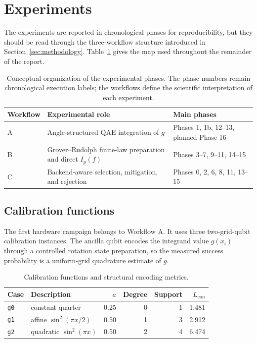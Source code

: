 \section{Experiments}
\label{sec:experiments}

The experiments are reported in chronological phases for reproducibility, but
they should be read through the three-workflow structure introduced in
Section~\ref{sec:methodology}. Table~\ref{tab:workflow-phase-map} gives the
map used throughout the remainder of the report.

\begin{table}[h]
\centering
\begin{tabular}{p{}p{}p{}}
\toprule
Workflow & Experimental role & Main phases \\
\midrule
A & Angle-structured QAE integration of \(g\)
  & Phases 1, 1b, 12--13, planned Phase 16 \\
B & Grover--Rudolph finite-law preparation and direct \(I_p(f)\)
  & Phases 3--7, 9--11, 14--15 \\
C & Backend-aware selection, mitigation, and rejection
  & Phases 0, 2, 6, 8, 11, 13--15 \\
\bottomrule
\end{tabular}
\caption{Conceptual organization of the experimental phases. The phase numbers
remain chronological execution labels; the workflows define the scientific
interpretation of each experiment.}
\label{tab:workflow-phase-map}
\end{table}

\subsection{Calibration functions}

The first hardware campaign belongs to Workflow A. It uses three
two-grid-qubit calibration instances. The ancilla qubit encodes the integrand
value \(g(x_i)\) through a controlled rotation state preparation, so the
measured success probability is a uniform-grid quadrature estimate of \(g\).

\begin{table}[h]
\centering
\begin{tabular}{llrrrr}
\toprule
Case & Description & \(a\) & Degree & Support & \(L_{\mathrm{can}}\) \\
\midrule
\texttt{g0} & constant quarter & 0.25 & 0 & 1 & 1.481 \\
\texttt{g1} & affine \(\sin^2(\pi x/2)\) & 0.50 & 1 & 3 & 2.912 \\
\texttt{g2} & quadratic \(\sin^2(\pi x)\) & 0.50 & 2 & 4 & 6.474 \\
\bottomrule
\end{tabular}
\caption{Calibration functions and structural encoding metrics.}
\label{tab:calibration-functions}
\end{table}

